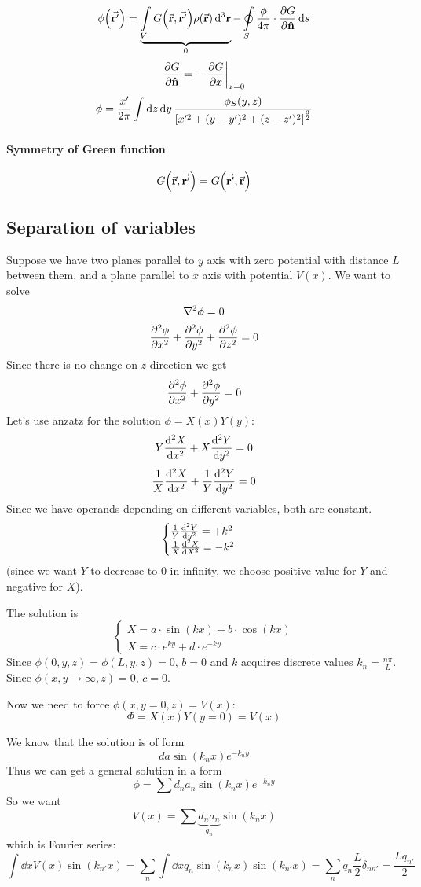 
$$ \phi\qty(\va{r'}) = \underbrace{\int\limits_V    G \qty(\va{r}, \va{r'})\rho\qty(\va{r}) \dd[3]{\vb{r}}}_{0} - \oint\limits_S  \frac{\phi }{4\pi}\cdot \pdv{G}{\vu{n}} \dd{s} $$
$$\pdv{G}{\vu{n}} = -\eval{\pdv{G}{x}}_{x=0}$$
$$\phi = \frac{x'}{2\pi} \int \dd{z} \dd{y} \frac{\phi_S(y,z)}{\qty[x'^2 + (y-y')^2 + (z-z')^2]^{\frac{3}{2}}}$$
\paragraph{Symmetry of Green function}
$$G \qty(\va{r}, \va{r'}) = G \qty(\va{r'}, \va{r})$$

\subsection{Separation of variables}

Suppose we have two planes parallel to $y$ axis with zero potential with distance $L$ between them, and a plane parallel to $x$ axis with potential $V(x)$. We want to solve
$$\laplacian{ \phi} = 0$$
$$\pdv[2]{\phi}{x}+\pdv[2]{\phi}{y}+\pdv[2]{\phi}{z}=0$$
Since there is no change on $z$ direction we get
$$\pdv[2]{\phi}{x}+\pdv[2]{\phi}{y}=0$$
Let's use anzatz for the solution $\phi = X(x)Y(y)$:
$$Y\dv[2]{X}{x} + X\dv[2]{Y}{y} = 0$$
$$\frac{1}{X}\dv[2]{X}{x} + \frac{1}{Y}\dv[2]{Y}{y} = 0$$
Since we have operands depending on different variables, both are constant.
$$\begin{cases}
\frac{1}{Y}\dv[2]{Y}{y} = +k^2\\
\frac{1}{X}\dv[2]{X}{X} = -k^2\\
\end{cases}$$
(since we want $Y$ to decrease to $0$ in infinity, we choose positive value for $Y$ and negative for $X$).

The solution is
$$\begin{cases}
X = a \cdot \sin(kx) + b \cdot \cos(kx)\\
X = c \cdot e^{ky} + d \cdot e^{-ky}
\end{cases}$$
Since $\phi(0,y,z) = \phi(L,y,z) = 0$, $b=0$ and $k$ acquires discrete values $k_n = \frac{n\pi }{L}$.
Since $\phi(x, y\to \infty, z) = 0$, $c=0$.

Now we need to force $\phi(x,y=0,z)=V(x)$:
$$\Phi = X(x)Y(y=0) = V(x)$$

We know that the solution is of form
$$da \sin (k_nx) e^{-k_ny}$$
Thus we can get a general solution in a form
$$\phi = \sum d_na_n \sin(k_n x) e^{-k_ny}$$
So we want
$$V(x) = \sum \underbrace{d_na_n}_{q_n} \sin(k_nx)$$
which is Fourier series:
$$\int \dd{x} V(x) \sin(k_{n'}x) = \sum_{n} \int \dd{x} q_n \sin(k_nx) \sin(k_{n'}x) = \sum_n q_n \frac{L}{2} \delta_{nn'} = \frac{Lq_{n'}}{2} $$

